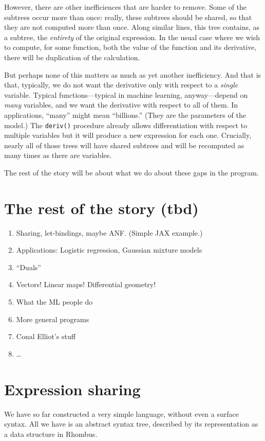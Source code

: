\documentclass[11pt, a4paper]{article}
\newcommand{\cd}[1]{\texttt{#1}}
\begin{document}
However, there are other inefficiences that are harder to remove. Some
of the subtrees occur more than once: really, these subtrees should be
shared, so that they are not computed more than once. Along similar
lines, this tree contains, as a subtree, the \emph{entirety} of the
original expression. In the usual case where we wish to compute, for
some function, both the value of the function and its derivative,
there will be duplication of the calculation.

But perhaps none of this matters as much as yet another
inefficiency. And that is that, typically, we do not want the
derivative only with respect to a \emph{single} variable. Typical
functions---typical in machine learning, anyway---depend on \emph{many}
variables, and we want the derivative with respect to all of them. In
applications, ``many'' might mean ``billions.'' (They are the
parameters of the model.) The \cd{deriv()} procedure already allows
differentiation with respect to multiple variables but it will produce
a new expression for each one. Crucially, nearly all of those trees
will have shared subtrees and will be recomputed as many times as
there are variables.

The rest of the story will be about what we do about these gaps in the
program.

\section{The rest of the story (tbd)}

\begin{enumerate}
\item Sharing, let-bindings, maybe ANF. (Simple JAX example.)
\item Applications: Logistic regression, Gaussian mixture models
\item ``Duals''
\item Vectors! Linear maps! Differential geometry!
\item What the ML people do 
\item More general programs
\item Conal Elliot's stuff
\item \dots
\end{enumerate}


\section{Expression sharing}

We have so far constructed a very simple language, without even a
surface syntax. All we have is an abstract syntax tree, described by
its representation as a data structure in Rhombus.
\end{document}
